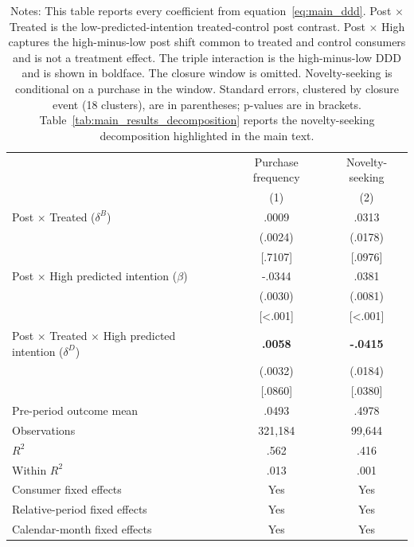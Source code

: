 \documentclass[11 pt]{article}
\newcommand\fnote[1]{\captionsetup{font=footnotesize}\caption*{#1}}
\begin{document}
\begin{table}[!ht]
\centering
\caption{Complete binary predicted-intention specifications}
\label{tab:appendix_binary_main_results}
\small
\begin{tabularx}{\textwidth}{Xcc}
\toprule
 & Purchase frequency & Novelty-seeking \\
 & (1) & (2) \\
\midrule
Post $\times$ Treated ($\delta^B$) & .0009 & .0313 \\
 & (.0024) & (.0178) \\
 & [.7107] & [.0976] \\
Post $\times$ High predicted intention ($\beta$) & -.0344 & .0381 \\
 & (.0030) & (.0081) \\
 & [<.001] & [<.001] \\
Post $\times$ Treated $\times$ High predicted intention ($\delta^D$) & \textbf{.0058} & \textbf{-.0415} \\
 & (.0032) & (.0184) \\
 & [.0860] & [.0380] \\
\addlinespace
Pre-period outcome mean & .0493 & .4978 \\
Observations & 321,184 & 99,644 \\
$R^2$ & .562 & .416 \\
Within $R^2$ & .013 & .001 \\
Consumer fixed effects & Yes & Yes \\
Relative-period fixed effects & Yes & Yes \\
Calendar-month fixed effects & Yes & Yes \\
\bottomrule
\end{tabularx}
\vspace{1mm}
\fnote{Notes: This table reports every coefficient from equation~\eqref{eq:main_ddd}. Post $\times$ Treated is the low-predicted-intention treated-control post contrast. Post $\times$ High captures the high-minus-low post shift common to treated and control consumers and is not a treatment effect. The triple interaction is the high-minus-low DDD and is shown in boldface. The closure window is omitted. Novelty-seeking is conditional on a purchase in the window. Standard errors, clustered by closure event (18 clusters), are in parentheses; p-values are in brackets. Table~\ref{tab:main_results_decomposition} reports the novelty-seeking decomposition highlighted in the main text.}
\end{table}
\end{document}
